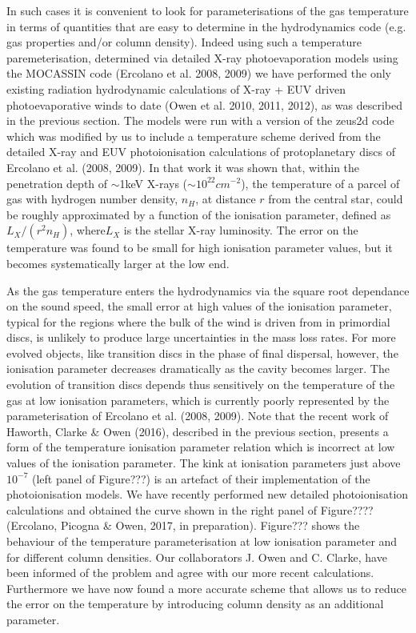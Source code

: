 \documentclass[10pt,fleqn,twoside]{article}
\begin{document}
In such cases it is convenient to look for parameterisations of the
gas temperature in terms of quantities that are easy to determine in
the hydrodynamics code (e.g. gas properties and/or column density). 
Indeed using such a temperature paremeterisation,
determined via detailed X-ray photoevaporation models using the
MOCASSIN code (Ercolano et al. 2008, 2009) we have performed the
only existing radiation hydrodynamic 
calculations of X-ray + EUV driven photoevaporative winds to date (Owen et
al. 2010, 2011, 2012), as was described in the previous section. The models were run with a version of the {\sc
  zeus2d} code which was modified by us to include a temperature
scheme derived from the detailed X-ray and EUV photoionisation
calculations of protoplanetary discs of Ercolano et al. (2008,
2009). In that work it was shown that, within the
penetration depth of $\sim$1keV X-rays ($\sim 10^{22}cm^{-2}$), the
temperature of a parcel of gas with hydrogen number density, $n_H$, at
distance $r$ from the central star, could be roughly approximated by a
function of the ionisation parameter, defined as $L_X/(r^2 n_H)$,
where$L_X$ is the stellar X-ray luminosity. The error on the
temperature was found to be small for high ionisation parameter values, but it
becomes systematically larger at the low end. 

As the gas temperature enters the hydrodynamics via the square root
dependance on the sound speed, the small error at high values of the
ionisation parameter, typical for the regions where the bulk of the
wind is driven from in primordial discs, is unlikely to produce large
uncertainties in the mass loss rates. For more evolved objects, like
transition discs in the phase of final dispersal, however, the ionisation
parameter decreases dramatically as the cavity becomes larger. The
evolution of transition discs depends thus sensitively on the temperature
of the gas at low ionisation parameters, which is currently poorly
represented by the parameterisation of Ercolano et al. (2008, 2009). 
Note that the recent work of Haworth, Clarke \& Owen (2016), described
in the previous section, presents a
form of the temperature ionisation parameter relation which is incorrect at
low values of the ionisation parameter. The kink at ionisation
parameters just above $10^{-7}$ (left panel of Figure???) is an artefact of their implementation
of the photoionisation models. We have recently performed new detailed
photoionisation calculations and obtained the curve shown in the right
panel of Figure???? (Ercolano, Picogna \& Owen, 2017, in preparation).
Figure??? shows the behaviour of the temperature parameterisation at
low ionisation parameter and for different column densities.  Our
collaborators J. Owen and C. Clarke, have been informed of the problem
and agree with our more recent calculations. Furthermore we have now
found a more accurate scheme that allows us to reduce the error on the
temperature by introducing  column density as an additional
parameter. 
\end{document}
